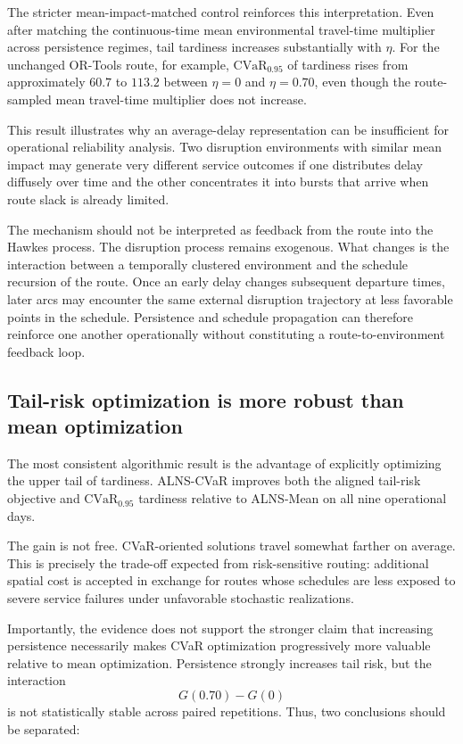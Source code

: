 \documentclass[preprint,12pt]{elsarticle}
\newcommand{\CVaR}{\mathrm{CVaR}}
\newcommand{\1}{\mathbf{1}}
\begin{document}
The stricter mean-impact-matched control reinforces this interpretation.
Even after matching the continuous-time mean environmental travel-time
multiplier across persistence regimes, tail tardiness increases substantially
with $\eta$. For the unchanged OR-Tools route, for example,
$\CVaR_{0.95}$ of tardiness rises from approximately $60.7$ to $113.2$
between $\eta=0$ and $\eta=0.70$, even though the route-sampled mean travel-time
multiplier does not increase.

This result illustrates why an average-delay representation can be insufficient
for operational reliability analysis. Two disruption environments with similar
mean impact may generate very different service outcomes if one distributes
delay diffusely over time and the other concentrates it into bursts that arrive
when route slack is already limited.

The mechanism should not be interpreted as feedback from the route into the
Hawkes process. The disruption process remains exogenous. What changes is the
interaction between a temporally clustered environment and the schedule
recursion of the route. Once an early delay changes subsequent departure times,
later arcs may encounter the same external disruption trajectory at less
favorable points in the schedule. Persistence and schedule propagation can
therefore reinforce one another operationally without constituting a
route-to-environment feedback loop.

\subsection{Tail-risk optimization is more robust than mean optimization}
\label{subsec:discussion_cvar}

The most consistent algorithmic result is the advantage of explicitly
optimizing the upper tail of tardiness. ALNS-CVaR improves both the aligned
tail-risk objective and $\CVaR_{0.95}$ tardiness relative to ALNS-Mean on all
nine operational days.

The gain is not free. CVaR-oriented solutions travel somewhat farther on
average. This is precisely the trade-off expected from risk-sensitive routing:
additional spatial cost is accepted in exchange for routes whose schedules are
less exposed to severe service failures under unfavorable stochastic
realizations.

Importantly, the evidence does not support the stronger claim that increasing
persistence necessarily makes CVaR optimization progressively more valuable
relative to mean optimization. Persistence strongly increases tail risk, but
the interaction
\[
G(0.70)-G(0)
\]
is not statistically stable across paired repetitions. Thus, two conclusions
should be separated:
\end{document}
